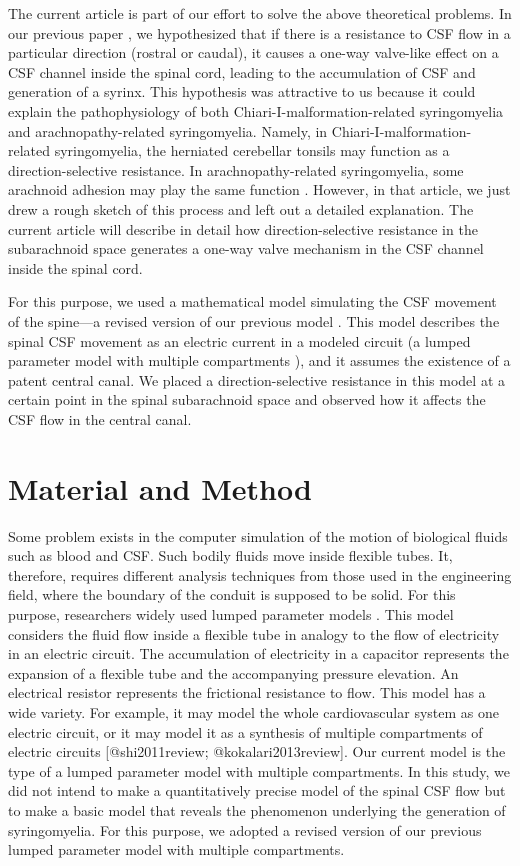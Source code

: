 \documentclass[fleqn,10pt]{wlscirep}
\begin{document}
The current article is part of our effort to solve the above theoretical
problems. In our previous paper \cite{chang2021hypothesis}, we hypothesized
that if there is a resistance to CSF flow in a particular direction
(rostral or caudal), it causes a one-way valve-like effect on a CSF channel
inside the spinal cord, leading to the accumulation of CSF and generation
of a syrinx. This hypothesis was attractive to us because it could explain
the pathophysiology of both Chiari-I-malformation-related syringomyelia and
arachnopathy-related syringomyelia. Namely, in
Chiari-I-malformation-related syringomyelia, the herniated cerebellar
tonsils may function as a direction-selective resistance. In
arachnopathy-related syringomyelia, some arachnoid adhesion may play the
same function \cite{chang2014dorsal}.  However, in that article, we just
drew a rough sketch of this process and left out a detailed explanation.
The current article will describe in detail how direction-selective
resistance in the subarachnoid space generates a one-way valve mechanism in
the CSF channel inside the spinal cord.

For this purpose, we used a mathematical model simulating the CSF movement
of the spine---a revised version of our previous model \cite{chang2003hypothesis,
chang2004theoretical}. This model describes the spinal CSF movement as an
electric current in a modeled circuit (a lumped parameter model with
multiple compartments \cite{shi2011review}), and it assumes the existence of a
patent central canal. We placed a direction-selective resistance in this
model at a certain point in the spinal subarachnoid space and observed how
it affects the CSF flow in the central canal.

\section*{Material and Method}

Some problem exists in the computer simulation of the motion of biological
fluids such as blood and CSF. Such bodily fluids move inside flexible
tubes. It, therefore, requires different analysis techniques from those
used in the engineering field, where the boundary of the conduit is
supposed to be solid. For this purpose, researchers widely used lumped
parameter models \cite{shi2011review, @kokalari2013review}. This model
considers the fluid flow inside a flexible tube in analogy to the flow of
electricity in an electric circuit. The accumulation of electricity in a
capacitor represents the expansion of a flexible tube and the accompanying
pressure elevation. An electrical resistor represents the frictional
resistance to flow. This model has a wide variety. For example, it may
model the whole cardiovascular system as one electric circuit, or it may
model it as a synthesis of multiple compartments of electric circuits
[@shi2011review; @kokalari2013review]. Our current model is the type of a
lumped parameter model with multiple compartments.  In this study, we did
not intend to make a quantitatively precise model of the spinal CSF flow
but to make a basic model that reveals the phenomenon underlying the
generation of syringomyelia. For this purpose, we adopted a revised version
of our previous lumped parameter model with multiple compartments.
\end{document}
